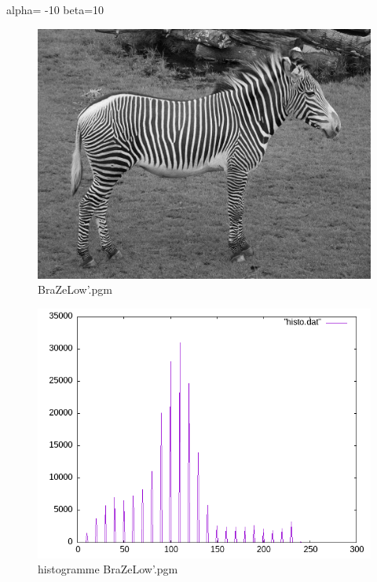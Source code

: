 \documentclass{article}
\begin{document}
alpha= -10
beta=10

\begin{figure}[h]
\centerline{\includegraphics[scale=0.5]{./rendus/AnimalInconnu.png}}
\caption{BraZeLow'.pgm}
\end{figure}

\begin{figure}[h]
\centerline{\includegraphics[scale=0.5]{./rendus/histoAnimalInconnu.png}}
\caption{histogramme BraZeLow'.pgm }
\end{figure}

\newpage
\end{document}
